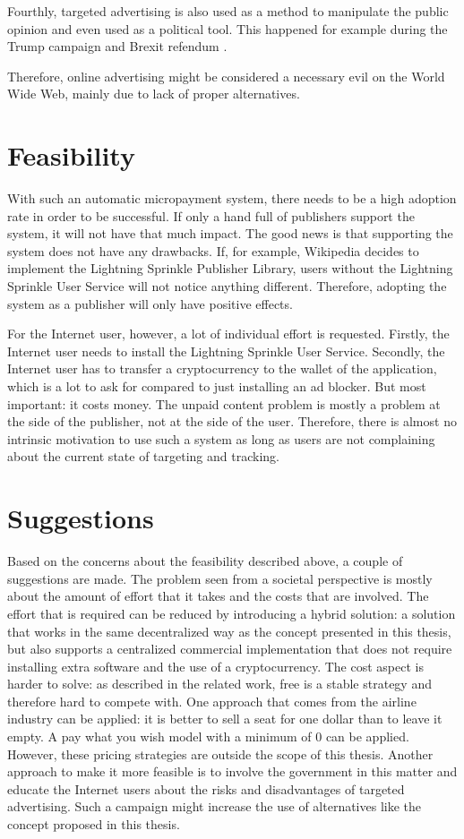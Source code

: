 Fourthly, targeted advertising is also used as a method to manipulate the public opinion and even used as a political tool. This happened for example during the Trump campaign and Brexit refendum \cite{cadwalladr2018cambridge}.

Therefore, online advertising might be considered a necessary evil on the World Wide Web, mainly due to lack of proper alternatives.

\section{Feasibility}
With such an automatic micropayment system, there needs to be a high adoption rate in order to be successful. If only a hand full of publishers support the system, it will not have that much impact. The good news is that supporting the system does not have any drawbacks. If, for example, Wikipedia decides to implement the Lightning Sprinkle Publisher Library, users without the Lightning Sprinkle User Service will not notice anything different. Therefore, adopting the system as a publisher will only have positive effects.

For the Internet user, however, a lot of individual effort is requested. Firstly, the Internet user needs to install the Lightning Sprinkle User Service. Secondly, the Internet user has to transfer a cryptocurrency to the wallet of the application, which is a lot to ask for compared to just installing an ad blocker. 
But most important: it costs money. The unpaid content problem is mostly a problem at the side of the publisher, not at the side of the user. Therefore, there is almost no intrinsic motivation to use such a system as long as users are not complaining about the current state of targeting and tracking. 

\section{Suggestions}
Based on the concerns about the feasibility described above, a couple of suggestions are made. The problem seen from a societal perspective is mostly about the amount of effort that it takes and the costs that are involved. The effort that is required can be reduced by introducing a hybrid solution: a solution that works in the same decentralized way as the concept presented in this thesis, but also supports a centralized commercial implementation that does not require installing extra software and the use of a cryptocurrency. The cost aspect is harder to solve: as described in the related work, free is a stable strategy and therefore hard to compete with. One approach that comes from the airline industry can be applied: it is better to sell a seat for one dollar than to leave it empty. A pay what you wish model with a minimum of 0 can be applied. However, these pricing strategies are outside the scope of this thesis. Another approach to make it more feasible is to involve the government in this matter and educate the Internet users about the risks and disadvantages of targeted advertising. Such a campaign might increase the use of alternatives like the concept proposed in this thesis.



